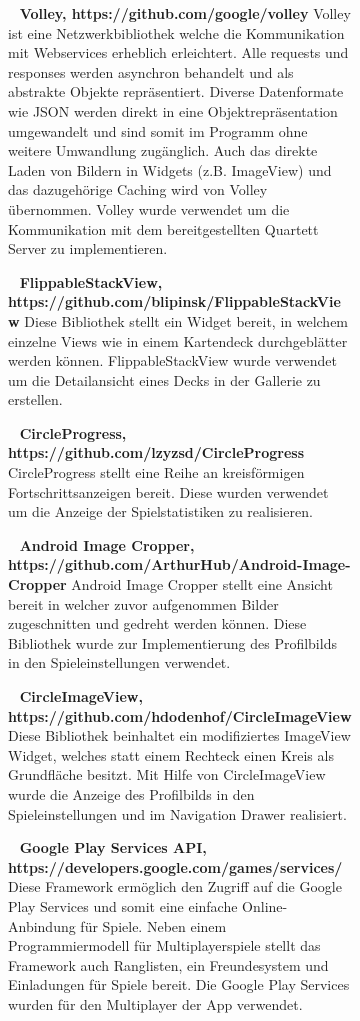 \documentclass{scrartcl}
\begin{document}
\begin{figure}[!ht]
\begin{figure}[!ht]
\ \newline
\textbf{Volley, https://github.com/google/volley} \newline
Volley ist eine Netzwerkbibliothek welche die Kommunikation mit Webservices
erheblich erleichtert. Alle requests und responses werden asynchron behandelt
und als abstrakte Objekte repräsentiert. Diverse Datenformate wie JSON werden
direkt in eine Objektrepräsentation umgewandelt und sind somit im Programm ohne
weitere Umwandlung zugänglich. Auch das direkte Laden von Bildern in Widgets
(z.B. ImageView) und das dazugehörige Caching wird von Volley übernommen. Volley
wurde verwendet um die Kommunikation mit dem bereitgestellten Quartett Server zu
implementieren.

\ \newline
\textbf{FlippableStackView, https://github.com/blipinsk/FlippableStackView} \newline
Diese Bibliothek stellt ein Widget bereit, in welchem einzelne Views wie in
einem Kartendeck durchgeblätter werden können. FlippableStackView wurde
verwendet um die Detailansicht eines Decks in der Gallerie zu erstellen.

\ \newline
\textbf{CircleProgress, https://github.com/lzyzsd/CircleProgress} \newline
CircleProgress stellt eine Reihe an kreisförmigen Fortschrittsanzeigen bereit.
Diese wurden verwendet um die Anzeige der Spielstatistiken zu realisieren.

\ \newline
\textbf{Android Image Cropper, https://github.com/ArthurHub/Android-Image-Cropper} \newline
Android Image Cropper stellt eine Ansicht bereit in welcher zuvor aufgenommen
Bilder zugeschnitten und gedreht werden können. Diese Bibliothek wurde zur
Implementierung des Profilbilds in den Spieleinstellungen verwendet.

\ \newline
\textbf{CircleImageView, https://github.com/hdodenhof/CircleImageView} \newline
Diese Bibliothek beinhaltet ein modifiziertes ImageView Widget, welches statt
einem Rechteck einen Kreis als Grundfläche besitzt. Mit Hilfe von
CircleImageView wurde die Anzeige des Profilbilds in den Spieleinstellungen und
im Navigation Drawer realisiert.

\ \newline
\textbf{Google Play Services API, https://developers.google.com/games/services/} \newline
Diese Framework ermöglich den Zugriff auf die Google Play Services und somit
eine einfache Online-Anbindung für Spiele. Neben einem Programmiermodell für
Multiplayerspiele stellt das Framework auch Ranglisten, ein Freundesystem und
Einladungen für Spiele bereit. Die Google Play Services wurden für den
Multiplayer der App verwendet.



\end{figure}
\end{figure}
\end{document}
